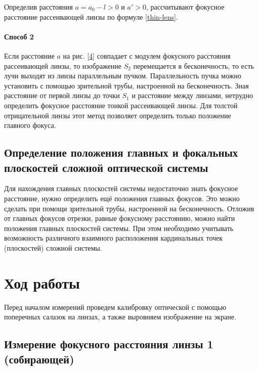 \documentclass[a4paper, 12pt]{article}%
\newcommand{\picref}[1]{рис. \ref{#1}}
\begin{document}
	
	Определив расстояния $ a = a_0 - l > 0$ и $ a'>0 $, рассчитывают фокусное расстояние рассеивающей линзы по формуле \eqref{thin-lens}.
	
	\paragraph{Способ 2}
	
	Если расстояние $ a $ на \picref{4} совпадает с модулем фокусного расстояния рассеивающей линзы, то изображение $S_2$ перемещается в бесконечность, то есть лучи выходят из линзы параллельным пучком. Параллельность пучка можно установить с помощью зрительной трубы, настроенной на бесконечность. Зная расстояние от первой линзы до точки $S_1$ и расстояние между линзами, нетрудно определить фокусное расстояние тонкой рассеивающей линзы. Для толстой отрицательной линзы этот метод позволяет определить только положение главного фокуса.
	
	
	\subsection{Определение положения главных и фокальных плоскостей сложной оптической системы}
	
	Для нахождения главных плоскостей системы недостаточно знать фокусное расстояние, нужно определить ещё положения главных фокусов. Это можно сделать при помощи зрительной трубы, настроенной на бесконечность. Отложив от главных фокусов отрезки, равные фокусному расстоянию, можно найти положения главных плоскостей системы. При этом необходимо учитывать возможность различного взаимного расположения кардинальных точек (плоскостей) сложной системы.
	\section{Ход работы}
	Перед началом измерений проведем калибровку оптической с помощью поперечных салазок на линзах, а также выровняем изображение на экране.
	\subsection{Измерение фокусного расстояния линзы 1 (собирающей)}
\end{document}
